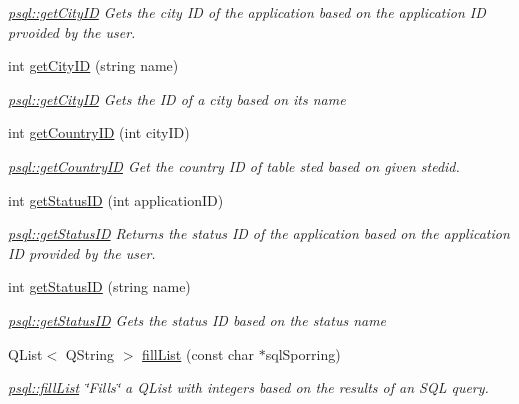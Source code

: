 \begin{DoxyCompactItemize}
\begin{DoxyCompactList}\small\item\em \mbox{\hyperlink{classpsql_af3462a12dc106e0ca8df4fa8fcf28436}{psql\+::get\+City\+ID}} Gets the city ID of the application based on the application ID prvoided by the user. \end{DoxyCompactList}\item 
int \mbox{\hyperlink{classpsql_a0c33b3f48064ba75abaa4b0b58eb1ccd}{get\+City\+ID}} (string name)
\begin{DoxyCompactList}\small\item\em \mbox{\hyperlink{classpsql_af3462a12dc106e0ca8df4fa8fcf28436}{psql\+::get\+City\+ID}} Gets the ID of a city based on its name \end{DoxyCompactList}\item 
int \mbox{\hyperlink{classpsql_a81d02dc0350ba11d90257914078ba432}{get\+Country\+ID}} (int city\+ID)
\begin{DoxyCompactList}\small\item\em \mbox{\hyperlink{classpsql_a81d02dc0350ba11d90257914078ba432}{psql\+::get\+Country\+ID}} Get the country ID of table sted based on given stedid. \end{DoxyCompactList}\item 
int \mbox{\hyperlink{classpsql_a9c02c92c09cb60c35d24375673b7df06}{get\+Status\+ID}} (int application\+ID)
\begin{DoxyCompactList}\small\item\em \mbox{\hyperlink{classpsql_a9c02c92c09cb60c35d24375673b7df06}{psql\+::get\+Status\+ID}} Returns the status ID of the application based on the application ID provided by the user. \end{DoxyCompactList}\item 
int \mbox{\hyperlink{classpsql_a9d13aebcb6d151719769207238865e75}{get\+Status\+ID}} (string name)
\begin{DoxyCompactList}\small\item\em \mbox{\hyperlink{classpsql_a9c02c92c09cb60c35d24375673b7df06}{psql\+::get\+Status\+ID}} Gets the status ID based on the status name \end{DoxyCompactList}\item 
Q\+List$<$ Q\+String $>$ \mbox{\hyperlink{classpsql_a2ad41caea89dc5af0b55b12f6394fbf5}{fill\+List}} (const char $\ast$sql\+Sporring)
\begin{DoxyCompactList}\small\item\em \mbox{\hyperlink{classpsql_a2ad41caea89dc5af0b55b12f6394fbf5}{psql\+::fill\+List}} \char`\"{}\+Fills\char`\"{} a Q\+List with integers based on the results of an S\+QL query. \end{DoxyCompactList}\item 

\end{DoxyCompactItemize}
